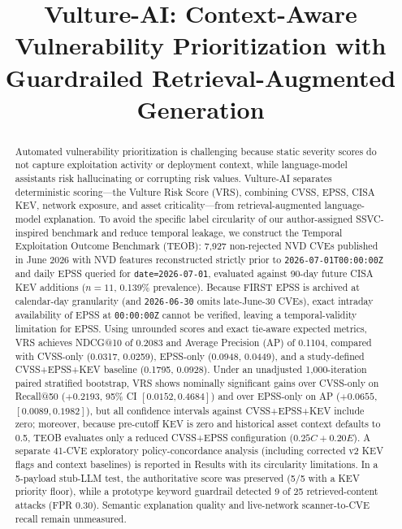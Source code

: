 \documentclass[conference]{IEEEtran}
\begin{document}
\title{Vulture-AI: Context-Aware Vulnerability Prioritization with Guardrailed Retrieval-Augmented Generation}

\author{
}

\maketitle

\begin{abstract}
Automated vulnerability prioritization is challenging because static severity scores do not capture exploitation activity or deployment context, while language-model assistants risk hallucinating or corrupting risk values. Vulture-AI separates deterministic scoring---the Vulture Risk Score (VRS), combining CVSS, EPSS, CISA KEV, network exposure, and asset criticality---from retrieval-augmented language-model explanation. To avoid the specific label circularity of our author-assigned SSVC-inspired benchmark and reduce temporal leakage, we construct the Temporal Exploitation Outcome Benchmark (TEOB): 7,927 non-rejected NVD CVEs published in June 2026 with NVD features reconstructed strictly prior to \texttt{2026-07-01T00:00:00Z} and daily EPSS queried for \texttt{date=2026-07-01}, evaluated against 90-day future CISA KEV additions ($n=11$, 0.139\% prevalence). Because FIRST EPSS is archived at calendar-day granularity (and \texttt{2026-06-30} omits late-June-30 CVEs), exact intraday availability of EPSS at \texttt{00:00:00Z} cannot be verified, leaving a temporal-validity limitation for EPSS. Using unrounded scores and exact tie-aware expected metrics, VRS achieves NDCG@10 of 0.2083 and Average Precision (AP) of 0.1104, compared with CVSS-only (0.0317, 0.0259), EPSS-only (0.0948, 0.0449), and a study-defined CVSS+EPSS+KEV baseline (0.1795, 0.0928). Under an unadjusted 1,000-iteration paired stratified bootstrap, VRS shows nominally significant gains over CVSS-only on Recall@50 ($+0.2193$, 95\% CI $[0.0152, 0.4684]$) and over EPSS-only on AP ($+0.0655$, $[0.0089, 0.1982]$), but all confidence intervals against CVSS+EPSS+KEV include zero; moreover, because pre-cutoff KEV is zero and historical asset context defaults to 0.5, TEOB evaluates only a reduced CVSS+EPSS configuration ($0.25C + 0.20E$). A separate 41-CVE exploratory policy-concordance analysis (including corrected v2 KEV flags and context baselines) is reported in Results with its circularity limitations. In a 5-payload stub-LLM test, the authoritative score was preserved (5/5 with a KEV priority floor), while a prototype keyword guardrail detected 9 of 25 retrieved-content attacks (FPR 0.30). Semantic explanation quality and live-network scanner-to-CVE recall remain unmeasured.
\end{abstract}
\end{document}
